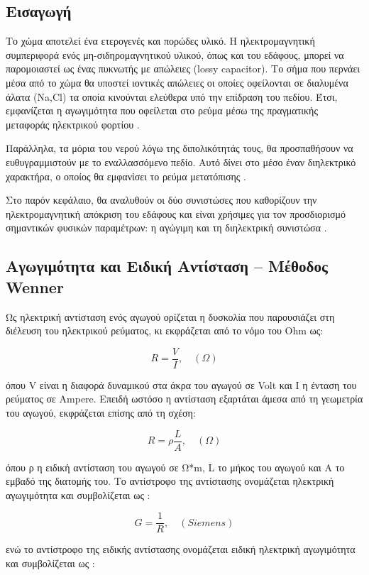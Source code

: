 \subsection{Εισαγωγή}

Το χώμα αποτελεί ένα ετερογενές και πορώδες υλικό. Η ηλεκτρομαγνητική
συμπεριφορά ενός μη-σιδηρομαγνητικού υλικού, όπως και του εδάφους,
μπορεί να παρομοιαστεί ως ένας πυκνωτής με απώλειες (lossy capacitor).
Το σήμα που περνάει μέσα από το χώμα θα υποστεί ιοντικές απώλειες οι
οποίες οφείλονται σε διαλυμένα άλατα (Na,Cl) τα οποία κινούνται ελεύθερα
υπό την επίδραση του πεδίου. Έτσι, εμφανίζεται η αγωγιμότητα που
οφείλεται στο ρεύμα μέσω της πραγματικής μεταφοράς ηλεκτρικού φορτίου \cite{ref18} .

Παράλληλα, τα μόρια του νερού λόγω της διπολικότητάς τους, θα
προσπαθήσουν να ευθυγραμμιστούν με το εναλλασσόμενο πεδίο. Αυτό δίνει
στο μέσο έναν διηλεκτρικό χαρακτήρα, ο οποίος θα εμφανίσει το ρεύμα
μετατόπισης \cite{ref18} .


Στο παρόν κεφάλαιο, θα αναλυθούν οι δύο συνιστώσες που καθορίζουν την
ηλεκτρομαγνητική απόκριση του εδάφους και είναι χρήσιμες για τον
προσδιορισμό σημαντικών φυσικών παραμέτρων: η αγώγιμη και τη διηλεκτρική
συνιστώσα .

\subsection{Αγωγιμότητα και Ειδική Αντίσταση -- Μέθοδος Wenner}

Ως ηλεκτρική αντίσταση ενός αγωγού ορίζεται η δυσκολία που παρουσιάζει
στη διέλευση του ηλεκτρικού ρεύματος, κι εκφράζεται από το νόμο του Οhm
ως:

\[R = \frac{V}{I},\quad(\Omega) \tag{2.5}\]

όπου V είναι η διαφορά δυναμικού στα άκρα του αγωγού σε Volt και I η
ένταση του ρεύματος σε Ampere. Επειδή ωστόσο η αντίσταση εξαρτάται άμεσα
από τη γεωμετρία του αγωγού, εκφράζεται επίσης από τη σχέση:

\[R = \rho\frac{L}{A},\quad(\Omega)\tag{2.6}\]

όπου ρ η ειδική αντίσταση του αγωγού σε Ω*m, L το μήκος του αγωγού και Α
το εμβαδό της διατομής του. Το αντίστροφο της αντίστασης ονομάζεται
ηλεκτρική αγωγιμότητα και συμβολίζεται ως \cite{ref14}:

\[G = \frac{1}{R},\quad(Siemens)\tag{2.7}\]

ενώ το αντίστροφο της ειδικής αντίστασης ονομάζεται ειδική ηλεκτρική
αγωγιμότητα και συμβολίζεται ως \cite{ref13}:

